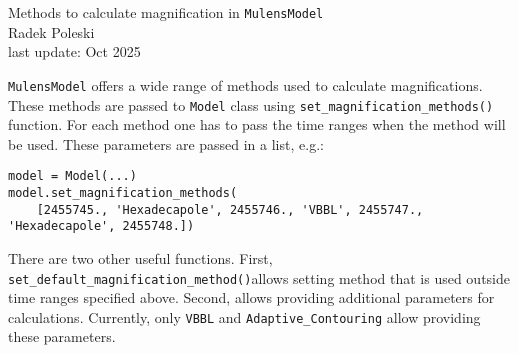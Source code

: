 \documentclass[12pt]{article}
\newcommand\MM{{\tt MulensModel}}
\begin{document}

\begin{center}
{\LARGE Methods to calculate magnification in \MM}\\
\bigskip
Radek Poleski\\
last update: Oct 2025
\end{center}

\bigskip\bigskip

{\MM} offers a wide range of methods used to calculate magnifications. 
These methods are passed to {\tt Model} class using 
{\tt set\_magnification\_methods()} function.  For each method one has to 
pass the time ranges when the method will be used.  These parameters are 
passed in a list, e.g.:

\begin{verbatim}
model = Model(...)
model.set_magnification_methods(
    [2455745., 'Hexadecapole', 2455746., 'VBBL', 2455747., 'Hexadecapole', 2455748.])
\end{verbatim}

There are two other useful functions. 
First, {\tt set\_default\_magnification\_method()}\linebreak allows setting method that 
is used outside time ranges specified above.  
Second,  allows 
providing additional parameters for calculations.  Currently, only 
{\tt VBBL} and {\tt Adaptive\_Contouring} allow providing these parameters. 
\end{document}

